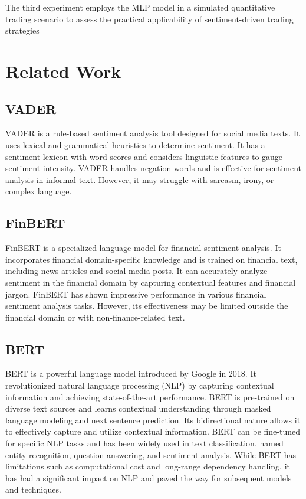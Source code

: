 \documentclass[11pt,a4paper]{article}
\begin{document}
The third experiment employs the MLP model in a simulated quantitative trading scenario to assess the practical applicability of sentiment-driven trading strategies



\section{Related Work}
\subsection{VADER}
VADER \cite{roehrick2020valence} is a rule-based sentiment analysis tool designed for social media texts. It uses lexical and grammatical heuristics to determine sentiment. It has a sentiment lexicon with word scores and considers linguistic features to gauge sentiment intensity. VADER handles negation words and is effective for sentiment analysis in informal text. However, it may struggle with sarcasm, irony, or complex language.
\subsection{FinBERT}
FinBERT \cite{araci2019finbert} is a specialized language model for financial sentiment analysis. It incorporates financial domain-specific knowledge and is trained on financial text, including news articles and social media posts. It can accurately analyze sentiment in the financial domain by capturing contextual features and financial jargon. FinBERT has shown impressive performance in various financial sentiment analysis tasks. However, its effectiveness may be limited outside the financial domain or with non-finance-related text.
\subsection{BERT}
BERT \cite{devlin2018bert} is a powerful language model introduced by Google in 2018. It revolutionized natural language processing (NLP) by capturing contextual information and achieving state-of-the-art performance. BERT is pre-trained on diverse text sources and learns contextual understanding through masked language modeling and next sentence prediction. Its bidirectional nature allows it to effectively capture and utilize contextual information. BERT can be fine-tuned for specific NLP tasks and has been widely used in text classification, named entity recognition, question answering, and sentiment analysis. While BERT has limitations such as computational cost and long-range dependency handling, it has had a significant impact on NLP and paved the way for subsequent models and techniques.
\end{document}
